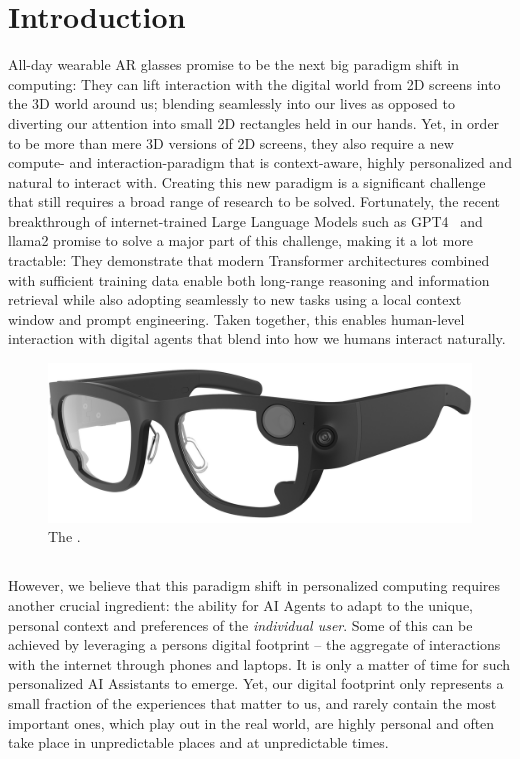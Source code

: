 \section{Introduction}
\label{sec:intro}

All-day wearable AR glasses promise to be the next big paradigm shift in computing: They can lift interaction with the digital world from 2D screens into the 3D world around us; blending seamlessly into our lives as opposed to diverting our attention into small 2D rectangles held in our hands. Yet, in order to be more than mere 3D versions of 2D screens, they also require a new compute- and interaction-paradigm that is context-aware, highly personalized and natural to interact with. Creating this new paradigm is a significant challenge that still requires a broad range of research to be solved.
%
Fortunately, the recent breakthrough of internet-trained Large Language Models such as GPT4~\cite{openai2023gpt4} and llama2 \cite{touvron2023llama} promise to solve a major part of this challenge, making it a lot more tractable:
They demonstrate that modern Transformer architectures combined with sufficient training data enable both long-range reasoning and information retrieval while also adopting seamlessly to new tasks using a local context window and prompt engineering. Taken together, this enables human-level interaction with digital agents that blend into how we humans interact naturally. 

\begin{figure}
    \centering
    \includegraphics[width=\linewidth]{images/sensors_aria_plain_cropped.jpg}
    \caption{The \AriaDevice.}
    \label{fig:aria-image}
\end{figure}
\subsection{\ProjectAria}

However, we believe that this paradigm shift in personalized computing requires another crucial ingredient: the ability for AI Agents to adapt to the unique, personal context and preferences of the \textit{individual user}. Some of this can be achieved by leveraging a persons digital footprint -- the aggregate of interactions with the internet through phones and laptops. It is only a matter of time for such personalized AI Assistants to emerge. Yet, our digital footprint only represents a small fraction of the experiences that matter to us, and rarely contain the most important ones, which play out in the real world, are highly personal and often take place in unpredictable places and at unpredictable times. 

